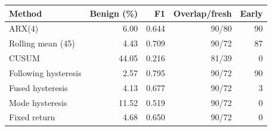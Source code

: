 \begin{tabular}{lrrrr}
\toprule
Method & Benign (\%) & F1 & Overlap/fresh & Early \\
\midrule
ARX(4) & 6.00 & 0.644 & 90/80 & 90 \\
Rolling mean (45) & 4.43 & 0.709 & 90/72 & 87 \\
CUSUM & 44.05 & 0.216 & 81/39 & 0 \\
Following hysteresis & 2.57 & 0.795 & 90/72 & 90 \\
Fused hysteresis & 4.13 & 0.677 & 90/72 & 3 \\
Mode hysteresis & 11.52 & 0.519 & 90/72 & 0 \\
Fixed return & 4.68 & 0.650 & 90/72 & 0 \\
\bottomrule
\end{tabular}
